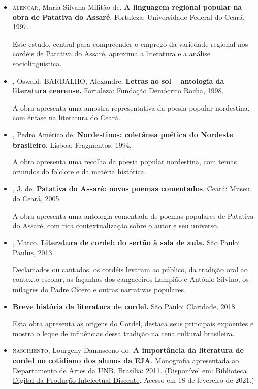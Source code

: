 \documentclass[12pt]{extarticle}
\begin{document}
\begin{itemize}

\item \textsc{alencar}, Maria Silvana Militão de. \textbf{A linguagem regional
popular na obra de Patativa do Assaré}. Fortaleza: Universidade
Federal do Ceará, 1997.

Este estudo, central para compreender o emprego da variedade regional
nos cordéis de Patativa do Assaré, aproxima a literatura e a análise
sociolinguística.


\item {}, Oswald; BARBALHO, Alexandre. \textbf{Letras ao sol --
antologia da literatura cearense.} Fortaleza: Fundação Demócrito
Rocha, 1998.

A obra apresenta uma amostra representativa da poesia popular
nordestina, com ênfase na literatura do Ceará.


\item {}, Pedro Américo de. \textbf{Nordestinos: coletânea poética do
Nordeste brasileiro}. Lisboa: Fragmentos, 1994.

A obra apresenta uma recolha da poesia popular nordestina, com temas
oriundos do folclore e da matéria histórica.


\item {}, J. de. \textbf{Patativa do Assaré: novos poemas
comentados}. Ceará: Museu do Ceará, 2005.

A obra apresenta uma antologia comentada de poemas populares de Patativa
do Assaré, com rica contextualização sobre o autor e seu universo.


\item {}, Marco. \textbf{Literatura de cordel: do sertão à sala de
aula.} São Paulo: Paulus, 2013.

Declamados ou cantados, os cordéis levaram ao público, da tradição oral
ao contexto escolar, as façanhas dos cangaceiros Lampião e Antônio
Silvino, os milagres do Padre Cícero e outras narrativas populares.


\item {} \textbf{Breve história da literatura de cordel.} São
Paulo: Claridade, 2018.

Esta obra apresenta as origens do Cordel, destaca seus principais
expoentes e mostra o leque de influências dessa tradição na cena
cultural brasileira.


\item \textsc{nascimento}, Lourgeny Damasceno do. \textbf{A importância da literatura
de cordel no cotidiano dos alunos da EJA}. Monografia apresentada ao
Departamento de Artes da UNB. Brasília: 2011. (Disponível em:
\href{https://bdm.unb.br/bitstream/10483/4463/1/2011_LourgenyDamascenodoNascimento.pdf}{Biblioteca Digital da Produção Intelectual Discente}.
Acesso em 18 de fevereiro de 2021.)


\end{itemize}
\end{document}
